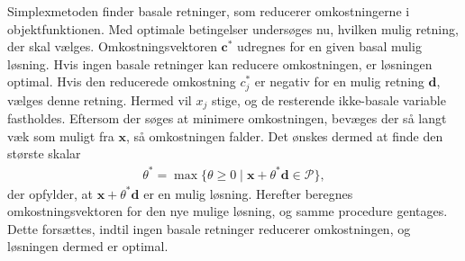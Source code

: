 \noindent
Simplexmetoden finder basale retninger, som reducerer omkostningerne i objektfunktionen. 
Med optimale betingelser undersøges nu, hvilken mulig retning, der skal vælges. 
Omkostningsvektoren $\mathbf{c}^*$ udregnes for en given basal mulig løsning. 
Hvis ingen basale retninger kan reducere omkostningen, er løsningen optimal. 
Hvis den reducerede omkostning $c^*_j$ er negativ for en mulig retning $\mathbf{d}$, vælges denne retning. 
Hermed vil $x_j$ stige, og de resterende ikke-basale variable fastholdes.
Eftersom der søges at minimere omkostningen, bevæges der så langt væk som muligt fra $\mathbf{x}$, så omkostningen falder.
Det ønskes dermed at finde den største skalar
\begin{align*}
\theta^* = \max \{ \theta \geq 0 \mid \textbf{x} + \theta^*\textbf{d} \in \mathcal{P} \},
\end{align*}
%
der opfylder, at $\mathbf{x} + \theta^* \mathbf{d}$ er en mulig løsning.
Herefter beregnes omkostningsvektoren for den nye mulige løsning, og samme procedure gentages. Dette forsættes, indtil ingen basale retninger reducerer omkostningen, og løsningen dermed er optimal.
%
%
%
%	
%	
%	
%	
%